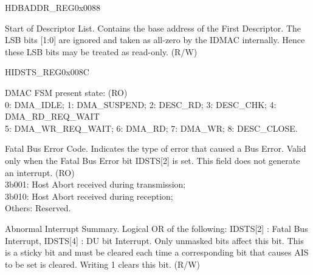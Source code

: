 \begin{register}{H}{DBADDR\_REG}{0x0088}\label{regdesc:DBADDRREG}
%
\regnewline%
\begin{regdesc}\begin{reglist}
\item [DBADDR\_REG]Start of Descriptor List. Contains the base address of the First Descriptor. The LSB bits [1:0] are ignored and taken as all-zero by the IDMAC internally. Hence these LSB bits may be treated as read-only. (R/W)
\end{reglist}\end{regdesc}
\end{register}


\begin{register}{H}{IDSTS\_REG}{0x008C}\label{regdesc:IDSTSREG}
%
%
%
%
%
%
%
%
%
%
%
%
\regnewline%
\begin{regdesc}\begin{reglist}
\item [IDSTS\_FSM]DMAC FSM present state: (RO)\\
0: DMA\_IDLE; 1: DMA\_SUSPEND; 2: DESC\_RD; 3: DESC\_CHK; 4: DMA\_RD\_REQ\_WAIT\\
5: DMA\_WR\_REQ\_WAIT; 6: DMA\_RD; 7: DMA\_WR; 8: DESC\_CLOSE.\\
\item [IDSTS\_FBE\_CODE]Fatal Bus Error Code. Indicates the type of error that caused a Bus Error. Valid only when the Fatal Bus Error bit IDSTS[2] is set. This field does not generate an interrupt. (RO)\\
3b001: Host Abort received during transmission;\\
3b010: Host Abort received during reception;\\
Others: Reserved.
\item [IDSTS\_AIS]Abnormal Interrupt Summary. Logical OR of the following: IDSTS[2] : Fatal Bus Interrupt, IDSTS[4] : DU bit Interrupt. Only unmasked bits affect this bit. This is a sticky bit and must be cleared each time a corresponding bit that causes AIS to be set is cleared. Writing 1 clears this bit. (R/W)

\end{reglist}
\end{regdesc}
\end{register}
